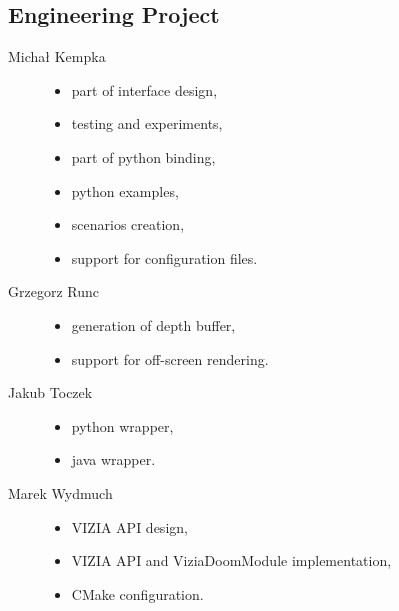 	\subsection{Engineering Project}
	\begin{description}
		\item[Michał Kempka] \hfill
			\begin{itemize}
				\item part of interface design,
				\item testing and experiments,
				\item part of python binding,
				\item python examples,
				\item scenarios creation,
				\item support for configuration files.
			\end{itemize}
		\item[Grzegorz Runc] \hfill
			\begin{itemize}
				\item generation of depth buffer,
				\item support for off-screen rendering.
			\end{itemize}
		\item[Jakub Toczek] \hfill
			\begin{itemize}
				\item python wrapper,
				\item java wrapper.
			\end{itemize}
		\item[Marek Wydmuch] \hfill
			\begin{itemize}
				\item VIZIA API design,
				\item VIZIA API and ViziaDoomModule implementation,
				\item CMake configuration.
			\end{itemize}
	\end{description}
	
   	
